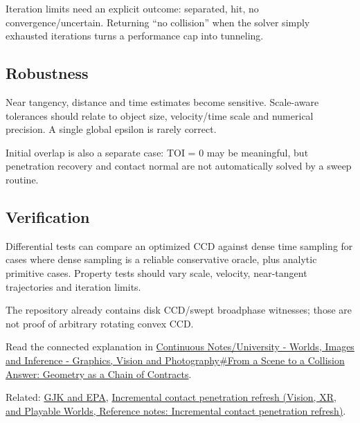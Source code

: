 Iteration limits need an explicit outcome: separated, hit, no convergence/uncertain. Returning ``no collision'' when the solver simply exhausted iterations turns a performance cap into tunneling.

\subsection{Robustness}\label{appendix-66956ed6c753-robustness}

\hypertarget{appendix-66956ed6c753-robustness}{}

Near tangency, distance and time estimates become sensitive. Scale-aware tolerances should relate to object size, velocity/time scale and numerical precision. A single global epsilon is rarely correct.

Initial overlap is also a separate case: TOI = 0 may be meaningful, but penetration recovery and contact normal are not automatically solved by a sweep routine.

\subsection{Verification}\label{appendix-66956ed6c753-verification}

\hypertarget{appendix-66956ed6c753-verification}{}

Differential tests can compare an optimized CCD against dense time sampling for cases where dense sampling is a reliable conservative oracle, plus analytic primitive cases. Property tests should vary scale, velocity, near-tangent trajectories and iteration limits.

The repository already contains disk CCD/swept broadphase witnesses; those are not proof of arbitrary rotating convex CCD.

Read the connected explanation in \hyperref[03-visual-computing-i-ch020-from-a-scene-to-a-collision-answer-geometry-as-a-chain-of-contracts]{Continuous Notes/University - Worlds, Images and Inference - Graphics, Vision and Photography\#From a Scene to a Collision Answer: Geometry as a Chain of Contracts}.

Related: \hyperref[appendix-aef6177f7b3f]{GJK and EPA}, \href{../07-Vision-XR-and-Playable-Worlds/main.pdf\#nameddest=appendix-f682275acbdf}{Incremental contact penetration refresh (Vision, XR, and Playable Worlds, Reference notes: Incremental contact penetration refresh)}.
